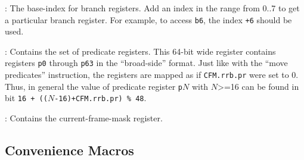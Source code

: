 \documentclass{article}
\begin{document}
\begin{Description}
\item[\Const{UNW\_IA64\_BR}:] The base-index for branch registers.
  Add an index in the range from 0..7 to get a particular branch
  register.  For example, to access \texttt{b6}, the index
  \texttt{+6} should be used.
\item[\Const{UNW\_IA64\_PR}:] Contains the set of predicate registers.
  This 64-bit wide register contains registers \texttt{p0} through
  \texttt{p63} in the ``broad-side'' format.  Just like with the
  ``move predicates'' instruction, the registers are mapped as if
  \texttt{CFM.rrb.pr} were set to 0.  Thus, in general the value of
  predicate register \texttt{p}$N$ with $N$>=16 can be found
  in bit \texttt{16 + (($N$-16)+CFM.rrb.pr) \% 48}.
\item[\Const{UNW\_IA64\_CFM}:] Contains the current-frame-mask
  register.
\end{Description}


\subsection{Convenience Macros}
\end{document}
